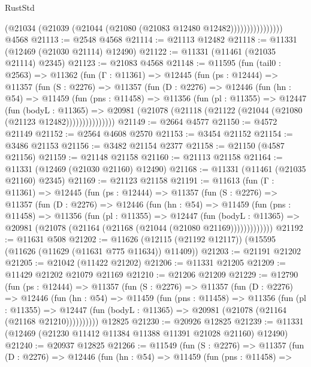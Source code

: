 \begin{lexlean}{RustStd}
\begin{coremodule}
                          (@21034 (@21039 (@21044 (@21080 (@21083 @12480 @12482))))))))))))))))
    @4568
@21113 := @2548 @4568
@21114 := @21113 @12482
@21118 := @11331 (@12469 (@21030 @21114) @12490)
@21122 := @11331 (@11461 (@21035 @21114) @2345)
@21123 := @21083 @4568
@21148 := @11595
    (fun (tail0 : @2563) =>
    @11362
      (fun (Γ : @11361) =>
      @12445
        (fun (ps : @12444) =>
        @11357
          (fun (S : @2276) =>
          @11357
            (fun (D : @2276) =>
            @12446
              (fun (hn : @54) =>
              @11459
                (fun (pns : @11458) =>
                @11356
                  (fun (pl : @11355) =>
                  @12447
                    (fun (bodyL : @11365) =>
                    @20981 (@21078 (@21118 (@21122 (@21044 (@21080 (@21123 @12482)))))))))))))))
@21149 := @2664 @4577
@21150 := @4572 @21149
@21152 := @2564 @4608 @2570
@21153 := @3454 @21152
@21154 := @3486 @21153
@21156 := @3482 @21154 @2377
@21158 := @21150 (@4587 @21156)
@21159 := @21148 @21158
@21160 := @21113 @21158
@21164 := @11331 (@12469 (@21030 @21160) @12490)
@21168 := @11331 (@11461 (@21035 @21160) @2345)
@21169 := @21123 @21158
@21191 := @11613
    (fun (Γ : @11361) =>
    @12445
      (fun (ps : @12444) =>
      @11357
        (fun (S : @2276) =>
        @11357
          (fun (D : @2276) =>
          @12446
            (fun (hn : @54) =>
            @11459
              (fun (pns : @11458) =>
              @11356
                (fun (pl : @11355) =>
                @12447
                  (fun (bodyL : @11365) =>
                  @20981 (@21078 (@21164 (@21168 (@21044 (@21080 @21169)))))))))))))
@21192 := @11631 @508
@21202 := @11626 (@12115 (@21192 @12117)) (@15595 (@11626 (@11629 (@11631 @775 @11634)) @11409))
@21203 := @21191 @21202
@21205 := @21042 (@11422 @21202)
@21206 := @11331 @21205
@21209 := @11429 @21202 @21079 @21169
@21210 := @21206 @21209
@21229 := @12790
    (fun (ps : @12444) =>
    @11357
      (fun (S : @2276) =>
      @11357
        (fun (D : @2276) =>
        @12446
          (fun (hn : @54) =>
          @11459
            (fun (pns : @11458) =>
            @11356
              (fun (pl : @11355) =>
              @12447 (fun (bodyL : @11365) => @20981 (@21078 (@21164 (@21168 @21210))))))))))
    @12825
@21230 := @20926 @12825
@21239 := @11331 (@12469 (@21230 @11412 @11384 @11388 @11391 @21028 @21160) @12490)
@21240 := @20937 @12825
@21266 := @11549
    (fun (S : @2276) =>
    @11357
      (fun (D : @2276) =>
      @12446
        (fun (hn : @54) =>
        @11459
          (fun (pns : @11458) =>

\end{coremodule}
\end{lexlean}
